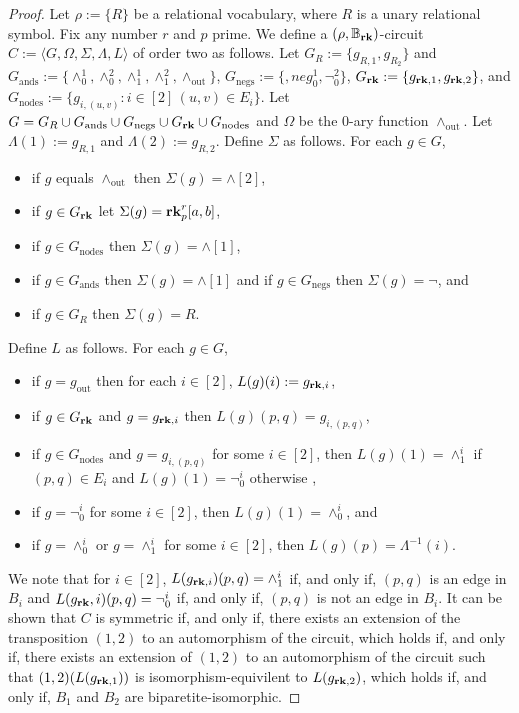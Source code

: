 \documentclass[../paper.tex]{subfiles}
\begin{document}
\begin{proof}
  Let $\rho:= \{R\}$ be a relational vocabulary, where $R$ is a unary relational
  symbol. Fix any number $r$ and $p$ prime. We define a $(\rho, \mathbb{B}_{\text{\textbf{rk}}})$-circuit $C
  := \langle G, \Omega, \Sigma, \Lambda, L \rangle$ of order two as follows. Let
  $G_{R} := \{g_{R, 1}, g_{R_2}\}$ and $G_{\text{ands}} := \{\land^1_0,
  \land^2_0, \land^1_1, \land^2_1 , \land_{\text{out}}\}$, $G_{\text{negs}} :=
  \{,neg^1_0, \neg^2_0\}$, $G_{\text{\textbf{rk}}} : = \{ g_{\text{\textbf{rk}}, 1}, g_{\text{\textbf{rk}}, 2}\}$, and
  $G_{\text{nodes}} := \{g_{i, (u,v)} : i \in [2] \, (u,v) \in E_i \}$. Let $G =
  G_R \cup G_{\text{ands}} \cup G_{\text{negs}} \cup G_{\text{\textbf{rk}}} \cup
  G_{\text{nodes}}$ and $\Omega$ be the $0$-ary function $\land_{\text{out}}$.
  Let $\Lambda(1) := g_{R, 1}$ and $\Lambda(2) := g_{R,2}$. Define $\Sigma$ as
  follows. For each $g \in G$,
  \begin{itemize}
    \setlength\itemsep{0mm}
  \item if $g$ equals $\land_{\text{out}}$ then $\Sigma(g) = \land[2]$,
  \item if $g \in G_{\text{\textbf{rk}}}$ let $\Sigma(g) = \text{\textbf{rk}}^r_p [a,b]$,
  \item if $g \in G_{\text{nodes}}$ then $\Sigma(g) = \land[1]$,
  \item if $g \in G_{\text{ands}}$ then $\Sigma(g) = \land[1]$ and if $g \in
    G_{\text{negs}}$ then $\Sigma(g) = \neg$, and
  \item if $g \in G_R$ then $\Sigma(g) = R$.
  \end{itemize}
  Define $L$ as follows. For each $g \in G$,
  \begin{itemize}
    \setlength\itemsep{0mm}
  \item if $g = g_{\text{out}}$ then for each $i \in [2]$, $L(g)(i) := g_{\text{\textbf{rk}},
      i}$,
  \item if $g \in G_{\text{\textbf{rk}}}$ and $g = g_{\text{\textbf{rk}}, i}$ then $L(g)(p,q) = g_{i,
      (p,q)}$,
  \item if $g \in G_{\text{nodes}}$ and $g = g_{i, (p,q)}$ for some $i \in [2]$,
    then $L(g)(1) = \land^i_1$ if $(p,q) \in E_i$ and $L(g)(1) = \neg^i_0$
    otherwise ,
  \item if $g = \neg^i_0$ for some $i \in [2]$, then $L(g)(1) = \land^i_0$, and
  \item if $g = \land^i_0$ or $g = \land^i_1$ for some $i \in [2]$, then
    $L(g)(p) = \Lambda^{-1}(i)$.
  \end{itemize}

  We note that for $i \in [2]$, $L(g_{\text{\textbf{rk}}, i})(p,q) = \land^i_1$ if, and only
  if, $(p,q)$ is an edge in $B_i$ and $L(g_{\text{\textbf{rk}}}, i)(p,q) = \neg^i_0$ if, and
  only if, $(p,q)$ is not an edge in $B_i$. It can be shown that $C$ is
  symmetric if, and only if, there exists an extension of the transposition
  $(1,2)$ to an automorphism of the circuit, which holds if, and only if, there
  exists an extension of $(1,2)$ to an automorphism of the circuit such that
  $(1,2) (L(g_{\text{\textbf{rk}}, 1}))$ is isomorphism-equivilent to $L(g_{\text{\textbf{rk}}, 2})$,
  which holds if, and only if, $B_1$ and $B_2$ are biparetite-isomorphic.


\end{proof}
\end{document}

